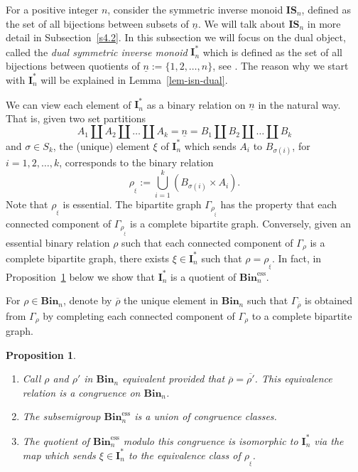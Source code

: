 \documentclass[a4paper]{amsart}
\newtheorem{proposition}[theorem]{Proposition}
\begin{document}
For a positive integer $n$, consider
the symmetric inverse monoid $\mathbf{IS}_n$, defined as the set of 
all bijections between subsets of $\underline{n}$. 
We will talk about $\mathbf{IS}_n$ in more detail in Subsection~\ref{s4.2}.
In this subsection we will focus on the dual  object, called the 
{\em dual symmetric inverse monoid}  $\mathbf{I}^*_n$  which is defined as the 
set of all bijections between quotients of $\underline{n}:=\{1,2,\dots,n\}$, see \cite{FL06}.
The reason why we start with $\mathbf{I}^*_n$ will be explained in Lemma~\ref{lem-isn-dual}.

We can view each element of $\mathbf{I}^*_n$ as a binary relation on 
$\underline{n}$ in the natural way. That is, given two set partitions
\begin{displaymath}
A_1\coprod A_2\coprod\dots \coprod A_k=
\underline{n}=B_1\coprod B_2\coprod \dots\coprod B_k
\end{displaymath}
and $\sigma\in S_k$, the (unique) element $\xi$ of $\mathbf{I}^*_n$ which sends 
$A_i$ to $B_{\sigma(i)}$, for $i=1,2,\dots,k$, corresponds to the binary relation 
\begin{displaymath}
\rho_{{}_\xi}:=\bigcup_{i=1}^k  (B_{\sigma(i)}\times A_i).
\end{displaymath}
Note that $\rho_{{}_\xi}$ is essential.
The bipartite graph $\Gamma_{\rho_{{}_\xi}}$ has the property that each connected
component of $\Gamma_{\rho_{{}_\xi}}$ is a complete bipartite graph. Conversely,
given an essential binary relation $\rho$ such that each connected component of 
$\Gamma_{\rho}$ is a complete bipartite graph, there exists $\xi\in \mathbf{I}^*_n$
such that $\rho=\rho_{{}_\xi}$. In fact, in Proposition~\ref{prop4.3.1-1} below
we show that $\mathbf{I}^*_n$ is a quotient of $\mathbf{Bin}_n^\mathrm{ess}$.

For $\rho\in\mathbf{Bin}_n$, denote by $\overline{\rho}$ the unique 
element in $\mathbf{Bin}_n$ such that $\Gamma_{\overline{\rho}}$
is obtained from $\Gamma_\rho$ by completing each connected component of 
$\Gamma_\rho$ to a complete bipartite graph.

\begin{proposition}\label{prop4.3.1-1}
\hspace{1mm}

\begin{enumerate}[$($a$)$]
\item\label{prop4.3.1-1.1} 
Call $\rho$ and $\rho'$ in $\mathbf{Bin}_n$ equivalent provided that 
$\overline{\rho}=\overline{\rho'}$. This equivalence relation is a 
congruence on $\mathbf{Bin}_n$.
\item\label{prop4.3.1-1.2}
The subsemigroup $\mathbf{Bin}_n^\mathrm{ess}$ is a union of congruence classes.
\item\label{prop4.3.1-1.3}
The quotient of $\mathbf{Bin}_n^\mathrm{ess}$ modulo
this congruence is isomorphic to $\mathbf{I}^*_n$ via the map which
sends $\xi\in \mathbf{I}^*_n$ to the 
equivalence class of $\rho_{{}_\xi}$.
\end{enumerate}
\end{proposition}
\end{document}

